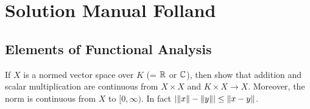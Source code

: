 \chapter{Solution Manual Folland}


\section{Elements of Functional Analysis}

\begin{problem}
	If $ X $ is a normed vector space over $ K $ (= $ \mathbb{R} $ or $ \mathbb{C} $), then show that addition and scalar multiplication are continuous from $ X\times X $ and $ K\times X \to X $. Moreover, the norm is continuous from $ X $ to $ [0,\infty) $. In fact $ |\norm{x} - \norm{y}| \leq \norm{x-y} $.
\end{problem}